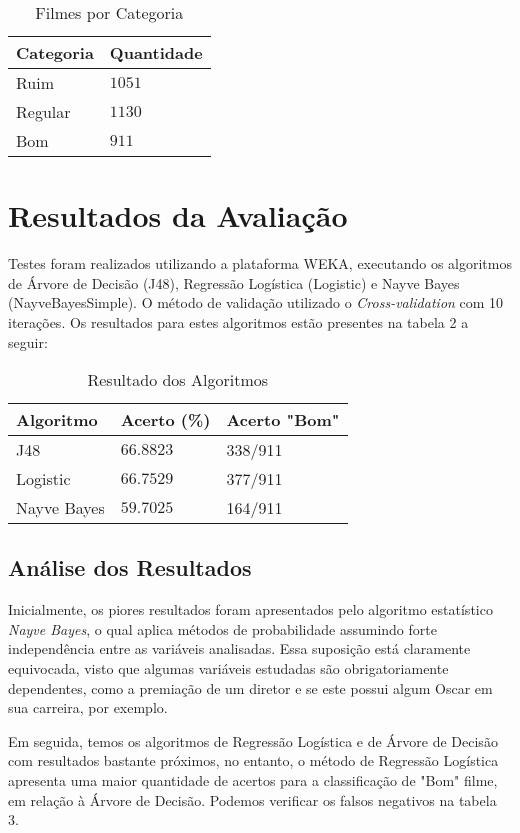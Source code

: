 \documentclass[twoside]{article}
\begin{document}
\begin{multicols}{2}
\begin{table}[H]
\caption{Filmes por Categoria}
\centering
\begin{tabular}{ll}
Categoria & Quantidade \\
\midrule
Ruim & $1051$ \\
Regular & $1130$ \\
Bom & $911$ \\
\bottomrule
\end{tabular}
\end{table}


\section{Resultados da Avaliação}

Testes foram realizados utilizando a plataforma WEKA, executando os algoritmos de Árvore de Decisão (J48), Regressão Logística (Logistic) e Nayve Bayes (NayveBayesSimple). O método de validação utilizado o \textit{Cross-validation} com 10 iterações. Os resultados para estes algoritmos estão presentes na tabela 2 a seguir:

\begin{table}[H]
\caption{Resultado dos Algoritmos}
\centering
\begin{tabular}{l|ll}
Algoritmo & Acerto (\%) & Acerto "Bom"\\
\midrule
J48 & $66.8823$ & 338/911\\
Logistic & $66.7529$ & 377/911\\
Nayve Bayes & $59.7025$ & 164/911\\
\bottomrule
\end{tabular}
\end{table}

\subsection{Análise dos Resultados}

Inicialmente, os piores resultados foram apresentados pelo algoritmo estatístico \textit{Nayve Bayes}, o qual aplica métodos de probabilidade assumindo forte independência entre as variáveis analisadas. Essa suposição está claramente equivocada, visto que algumas variáveis estudadas são obrigatoriamente dependentes, como a premiação de um diretor e se este possui algum Oscar em sua carreira, por exemplo.

Em seguida, temos os algoritmos de Regressão Logística e de Árvore de Decisão com resultados bastante próximos, no entanto, o método de Regressão Logística apresenta uma maior quantidade de acertos para a classificação de "Bom" filme, em relação à Árvore de Decisão. Podemos verificar os falsos negativos na tabela 3.


\end{multicols}
\end{document}
